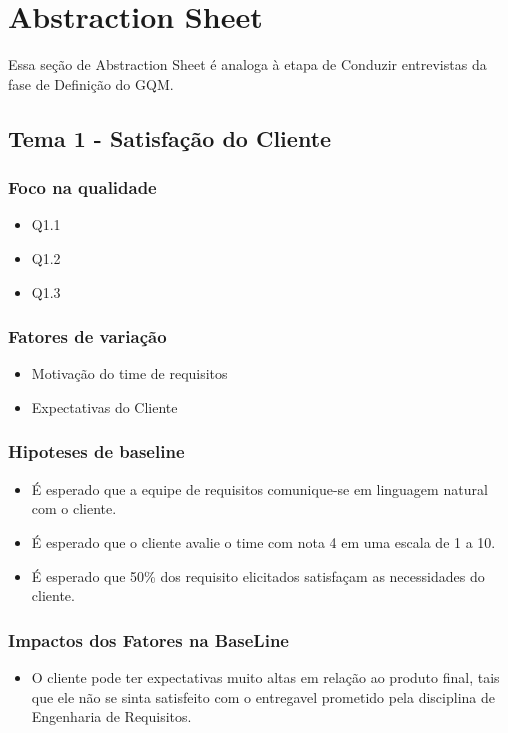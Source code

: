 \chapter{Abstraction Sheet}

Essa seção de Abstraction Sheet é analoga à etapa de Conduzir entrevistas da fase de Definição do GQM.

\section{Tema 1 - Satisfação do Cliente}

	\subsection{Foco na qualidade}
		\begin{itemize}  
		\item Q1.1
		\item Q1.2
		\item Q1.3
		\end{itemize}
	\subsection{Fatores de variação}
		\begin{itemize}  
		\item Motivação do time de requisitos
		\item Expectativas do Cliente
		\end{itemize}
	\subsection{Hipoteses de baseline}
		\begin{itemize}  
		\item É esperado que a equipe de requisitos comunique-se em linguagem natural com o cliente.
		\item É esperado que o cliente avalie o time com nota 4 em uma escala de 1 a 10.
		\item É esperado que 50\% dos requisito elicitados satisfaçam as necessidades do cliente.
		\end{itemize}
	\subsection{Impactos dos Fatores na BaseLine}
	\begin{itemize}  
		\item O cliente pode ter expectativas muito altas em relação ao produto final, tais que ele não se sinta satisfeito com o entregavel prometido pela disciplina de Engenharia de Requisitos.
		\end{itemize}




